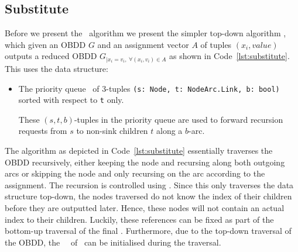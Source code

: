 \subsection{Substitute} \label{sec:theory_substitute}
Before we present the \Apply\ algorithm we present the simpler top-down
algorithm \Substitute, which given an OBDD $G$ and an assignment vector $A$ of
tuples $(x_i, \mathit{value})$ outputs a reduced OBDD $G_{| x_i = v_i ,\ \forall
  (x_i,v_i) \in A}$ as shown in Code~\ref{lst:substitute}.  This uses the data
structure:

\begin{itemize}
\item The priority queue \SubstituteQrec\ of 3-tuples
    \lstinline{(s: Node, t: NodeArc.Link, b: bool)} sorted with respect to
    \lstinline{t} only.

  These $(s,t,b)$-tuples in the priority queue are used to forward recursion
  requests from $s$ to non-sink children $t$ along a $b$-arc.
\end{itemize}

The algorithm as depicted in Code~\ref{lst:substitute} essentially traverses the
OBDD recursively, either keeping the node and recursing along both outgoing arcs
or skipping the node and only recursing on the arc according to the assignment.
The recursion is controlled using \SubstituteQrec. Since this only traverses the
data structure top-down, the nodes traversed do not know the index of their
children before they are outputted later. Hence, these nodes will not contain an
actual index to their children. Luckily, these references can be fixed as part
of the bottom-up traversal of the final \Reduce. Furthermore, due to the
top-down traversal of the OBDD, the \ReduceLwork\, \ReduceLdep\ of \Reduce\ can
be initialised during the traversal.

